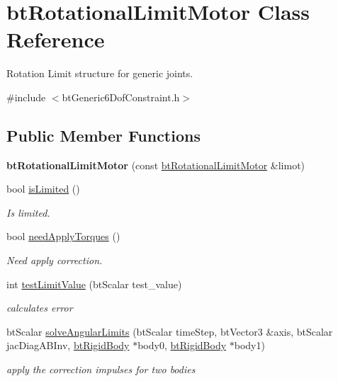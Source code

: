 \hypertarget{classbt_rotational_limit_motor}{\section{bt\+Rotational\+Limit\+Motor Class Reference}
\label{classbt_rotational_limit_motor}
}


Rotation Limit structure for generic joints.  




{\ttfamily \#include $<$bt\+Generic6\+Dof\+Constraint.\+h$>$}

\subsection*{Public Member Functions}
\begin{DoxyCompactItemize}
\item 
\hypertarget{classbt_rotational_limit_motor_a2e7652de69dacf8f37eaef5fd460f4a3}{{\bfseries bt\+Rotational\+Limit\+Motor} (const \hyperlink{classbt_rotational_limit_motor}{bt\+Rotational\+Limit\+Motor} \&limot)}\label{classbt_rotational_limit_motor_a2e7652de69dacf8f37eaef5fd460f4a3}

\item 
\hypertarget{classbt_rotational_limit_motor_ac47bf3f6fe0afc82d123407221d4cb10}{bool \hyperlink{classbt_rotational_limit_motor_ac47bf3f6fe0afc82d123407221d4cb10}{is\+Limited} ()}\label{classbt_rotational_limit_motor_ac47bf3f6fe0afc82d123407221d4cb10}

\begin{DoxyCompactList}\small\item\em Is limited. \end{DoxyCompactList}\item 
\hypertarget{classbt_rotational_limit_motor_af8f10179d361ad46f5a4636822af6d7d}{bool \hyperlink{classbt_rotational_limit_motor_af8f10179d361ad46f5a4636822af6d7d}{need\+Apply\+Torques} ()}\label{classbt_rotational_limit_motor_af8f10179d361ad46f5a4636822af6d7d}

\begin{DoxyCompactList}\small\item\em Need apply correction. \end{DoxyCompactList}\item 
int \hyperlink{classbt_rotational_limit_motor_ac0651bd36beda2dbb23c45a90dc1cccd}{test\+Limit\+Value} (bt\+Scalar test\+\_\+value)
\begin{DoxyCompactList}\small\item\em calculates error \end{DoxyCompactList}\item 
bt\+Scalar \hyperlink{classbt_rotational_limit_motor_ad52e9b1c402c7bdd47fb1a9de28afb7e}{solve\+Angular\+Limits} (bt\+Scalar time\+Step, bt\+Vector3 \&axis, bt\+Scalar jac\+Diag\+A\+B\+Inv, \hyperlink{classbt_rigid_body}{bt\+Rigid\+Body} $\ast$body0, \hyperlink{classbt_rigid_body}{bt\+Rigid\+Body} $\ast$body1)
\begin{DoxyCompactList}\small\item\em apply the correction impulses for two bodies \end{DoxyCompactList}\end{DoxyCompactItemize}
